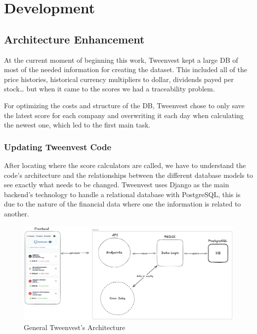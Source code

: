 \documentclass[11pt,english,a4paper,hidelinks]{book}
\begin{document}
\chapter{Development}

\section{Architecture Enhancement}


\noindent At the current moment of beginning this work, Tweenvest kept a large DB of most of the needed information for creating the dataset. This included all of the price histories, historical currency multipliers to dollar, dividends payed per stock… but when it came to the scores we had a traceability problem.

\vspace{0.5cm}
\noindent For optimizing the costs and structure of the DB, Tweenvest chose to only save the latest score for each company and overwriting it each day when calculating the newest one, which led to the first main task.

\subsection{Updating Tweenvest Code}

After locating where the score calculators are called, we have to understand the code's architecture and the relationships between the different database models to see exactly what needs to be changed. Tweenvest uses Django as the main backend's technology to handle a relational database with PostgreSQL, this is due to the nature of the financial data where one the information is related to another.

\begin{figure}[H]
    \centering
    \includegraphics[width=1\textwidth]{images/tweenvest/general architecture.png}
    \caption{General Tweenvest's Architecture}
    \label{fig:general_architecture}
\end{figure}
\end{document}
